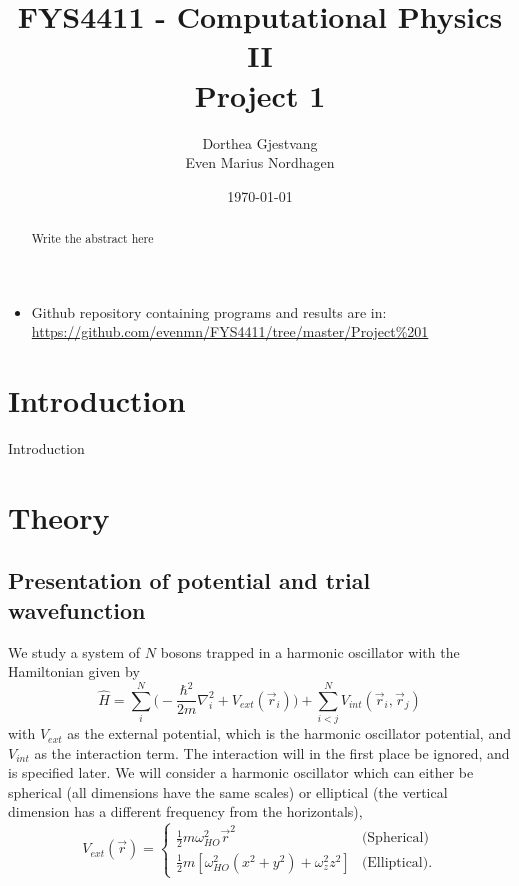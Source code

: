 \documentclass[norsk,a4paper,12pt]{article}
\title{FYS4411 - Computational Physics II\\\vspace{2mm} \Large{Project 1}}
\author{\large Dorthea Gjestvang\\ Even Marius Nordhagen}
\date\today
\begin{document}
\maketitle
\begin{abstract}
Write the abstract here
\par 

\end{abstract}


\begin{itemize}
\item Github repository containing programs and results are in: \url{https://github.com/evenmn/FYS4411/tree/master/Project%201}
\end{itemize}


\section{Introduction}
Introduction

\section{Theory}

\subsection{Presentation of potential and trial wavefunction} 

We study a system of $N$ bosons trapped in a harmonic oscillator with the Hamiltonian given by 
\begin{equation}
\hat{H}=\sum_i^N\bigg(-\frac{\hbar^2}{2m}\nabla_i^2+V_{ext}(\vec{r}_i)\bigg)+\sum_{i<j}^NV_{int}(\vec{r}_i,\vec{r}_j)
\label{eq:Hamilton}
\end{equation}
with $V_{ext}$ as the external potential, which is the harmonic oscillator potential,
and $V_{int}$ as the interaction term. The interaction will in the first place be ignored, and is specified later. We will consider a harmonic oscillator which can either be spherical (all dimensions have the same scales) or elliptical (the vertical dimension has a different frequency from the horizontals),
\begin{equation}
\label{eq:V_ext}
V_{ext}(\vec{r})=
\begin{cases} 
   \frac{1}{2}m\omega_{HO}^2\vec{r}^2 & \text{(Spherical)} \\
   \frac{1}{2}m[\omega_{HO}^2(x^2 + y^2) + \omega_z^2z^2] & \text{(Elliptical)}.
\end{cases}
\end{equation}
\end{document}
